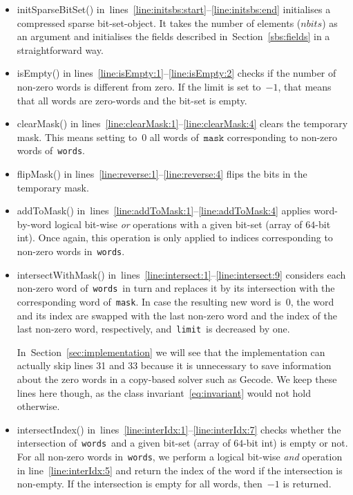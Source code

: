 \documentclass[a4paper,11pt]{article}
\theoremstyle{definition}
\newcommand{\Secref}[1]{Section~\ref{#1}}
\newcommand{\linesref}[2]{lines~\ref{#1}--\ref{#2}}
\newcommand{\Eqref}[1]{\eqref{#1}}
\newcommand{\Words}{\texttt{words}}
\newcommand{\Mask}{\texttt{mask}}
\newcommand{\Limit}{\texttt{limit}}
\newcommand{\bitset}[0]{compressed sparse bit-set}
\numberwithin{equation}{section}
\begin{document}
\begin{itemize}
  \item initSparseBitSet() in~\linesref{line:initsbs:start}{line:initsbs:end}
    initialises a \bitset-object. It takes
    the number of elements ($\mathit{nbits}$) as an argument and initialises the fields
    described in~\Secref{sbs:fields} in a straightforward way.

  \item isEmpty() in lines~\ref{line:isEmpty:1}--\ref{line:isEmpty:2} checks
    if the number of non-zero words is different from zero. If the limit is
    set to~$-1$, that means that all words are zero-words and the bit-set
    is empty.

  \item clearMask() in lines~\ref{line:clearMask:1}--\ref{line:clearMask:4}
    clears the temporary mask. This means setting to~$0$ all words of~$\Mask$
    corresponding to non-zero words of~\Words.

  \item flipMask() in lines~\ref{line:reverse:1}--\ref{line:reverse:4}
    flips the bits in the temporary mask.

  \item addToMask() in~\linesref{line:addToMask:1}{line:addToMask:4} applies
    word-by-word logical bit-wise
    \emph{or} operations with a given bit-set (array of $64$-bit int).
    Once again, this operation is only applied to indices corresponding to
    non-zero words in~\Words.

  \item intersectWithMask() in~\linesref{line:intersect:1}{line:intersect:9}
    considers each non-zero word of~\Words~in turn
    and replaces it by its intersection with the corresponding word of~\Mask.
    In case the resulting new word is~$0$,
    the word and its index are swapped with the last non-zero word and
    the index of the last non-zero word, respectively, and~\Limit~is decreased
    by one.

    In~\Secref{sec:implementation} we will see that the implementation
    can actually skip lines 31 and 33 because it is unnecessary
    to save information about the zero words in a copy-based solver such
    as Gecode.
    We keep these
    lines here though, as the class invariant~\Eqref{eq:invariant}
    would not hold otherwise.

  \item intersectIndex() in~\linesref{line:interIdx:1}{line:interIdx:7}
    checks whether the intersection of~\Words~and a given bit-set
    (array of $64$-bit int) is empty or not. For all non-zero words in~\Words,
    we perform a logical bit-wise \emph{and} operation
    in line~\ref{line:interIdx:5} and return
    the index of the word if the intersection is non-empty. If the
    intersection is empty for all words, then~$-1$ is returned.
\end{itemize}
\end{document}
